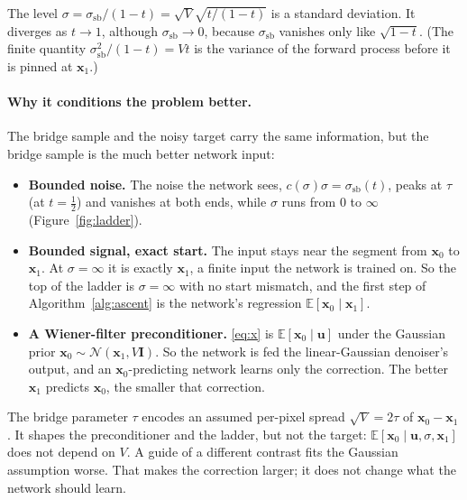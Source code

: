 \documentclass[11pt]{article}
\newcommand{\x}{\bm{x}}
\newcommand{\uu}{\bm{u}}
\newcommand{\E}{\mathbb{E}}
\newcommand{\N}{\mathcal{N}}
\newcommand{\Id}{\bm{I}}
\newcommand{\ssb}{\sigma_{\mathrm{sb}}}
\begin{document}
The level $\sigma = \ssb/(1-t) = \sqrt V\sqrt{t/(1-t)}$ is a standard deviation. It diverges as
$t\to1$, although $\ssb\to0$, because $\ssb$ vanishes only like $\sqrt{1-t}$. (The finite
quantity $\ssb^2/(1-t)=Vt$ is the variance of the forward process before it is pinned at $\x_1$.)

\paragraph{Why it conditions the problem better.} The bridge sample and the noisy target carry
the same information, but the bridge sample is the much better network input:
\begin{itemize}[leftmargin=1.5em, itemsep=1pt]
  \item \textbf{Bounded noise.} The noise the network sees, $c(\sigma)\sigma = \ssb(t)$,
        peaks at $\tau$ (at $t=\tfrac12$) and vanishes at both ends, while $\sigma$ runs from
        $0$ to $\infty$ (Figure~\ref{fig:ladder}).
  \item \textbf{Bounded signal, exact start.} The input stays near the segment from $\x_0$ to
        $\x_1$. At $\sigma=\infty$ it is exactly $\x_1$, a finite input the network is trained
        on. So the top of the ladder is $\sigma=\infty$ with no start mismatch, and the first
        step of Algorithm~\ref{alg:ascent} is the network's regression $\E[\x_0\mid\x_1]$.
  \item \textbf{A Wiener-filter preconditioner.} \eqref{eq:x} is $\E[\x_0\mid\uu]$ under the
        Gaussian prior $\x_0\sim\N(\x_1,V\Id)$. So the network is fed the linear-Gaussian
        denoiser's output, and an $\x_0$-predicting network learns only the correction. The
        better $\x_1$ predicts $\x_0$, the smaller that correction.
\end{itemize}
The bridge parameter $\tau$ encodes an assumed per-pixel spread $\sqrt V=2\tau$ of $\x_0-\x_1$.
It shapes the preconditioner and the ladder, but not the target: $\E[\x_0\mid\uu,\sigma,\x_1]$
does not depend on $V$. A guide of a different contrast fits the Gaussian assumption worse. That
makes the correction larger; it does not change what the network should learn.
\end{document}
